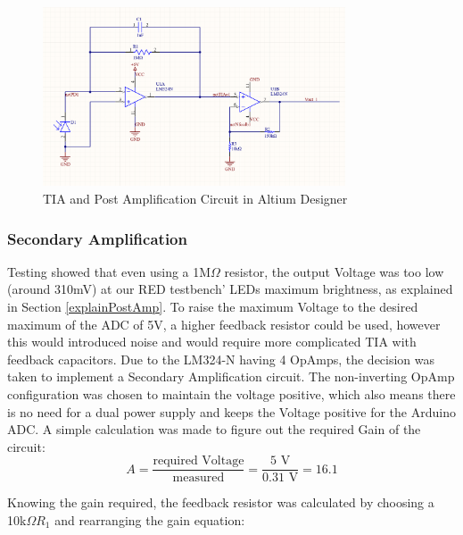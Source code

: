 %
\begin{figure}[htbp] %
    \centering
    \includegraphics[width=0.8\textwidth]{chapters/methodology/prototype/AltiumSingleCircuit_wCap.png}
    \caption{TIA and Post Amplification Circuit in Altium Designer}
    \label{fig:AltiumDis}
  \end{figure}
%
%
\subsubsection{Secondary Amplification}
\label{secondAmp}  
Testing showed that even using a 1M$\Omega$ resistor, the output Voltage was too low (around 310mV) at our \ac{RED} testbench' \acp{LED} maximum brightness, as explained in Section \ref{explainPostAmp}. To raise the maximum Voltage to the desired maximum of the ADC of 5V, a higher feedback resistor could be used, however this would introduced noise and would require more complicated TIA with feedback capacitors. Due to the LM324-N having 4 \acp{OpAmp}, the decision was taken to implement a Secondary Amplification circuit. The non-inverting \ac{OpAmp} configuration was chosen to maintain the voltage positive, which also means there is no need for a dual power supply and keeps the Voltage positive for the Arduino ADC.
A simple calculation was made to figure out the required Gain of the circuit:
\begin{equation} \label{gainCalc}
  A = \frac{\text{required Voltage}}{\text{measured}} = \frac{5\text{ V}}{0.31\text{ V}} = 16.1
  \end{equation}

Knowing the gain required, the feedback resistor was calculated by choosing a 10k$\Omega R_1$ and rearranging the gain equation:

